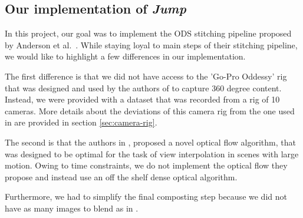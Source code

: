 \documentclass[10pt,twocolumn,letterpaper]{article}
\begin{document}
\subsection{Our implementation of \textit{Jump} \cite{jump16}}
In this project, our goal was to implement the ODS stitching pipeline proposed by Anderson et al.~\cite{jump16}. While staying loyal to main steps of their stitching pipeline, we would like to highlight a few differences in our implementation. 

The first difference is that we did not have access to the 'Go-Pro Oddessy' rig that was designed and used by the authors of \cite{jump16} to capture 360 degree content. Instead, we were provided with a dataset that was recorded from a rig of 10 cameras. More details about the deviations of this camera rig from the one used in \cite{jump16} are provided in section \ref{sec:camera-rig}. 

The second is that the authors in \cite{jump16}, proposed a novel optical flow algorithm, that was designed to be optimal for the task of view interpolation in scenes with large motion.  Owing to time constraints, we do not implement the optical flow they propose and instead use an off the shelf dense optical algorithm. 

Furthermore, we had to simplify the final composting step because we did not have as many images to blend as in \cite{jump16}.

\end{document}
